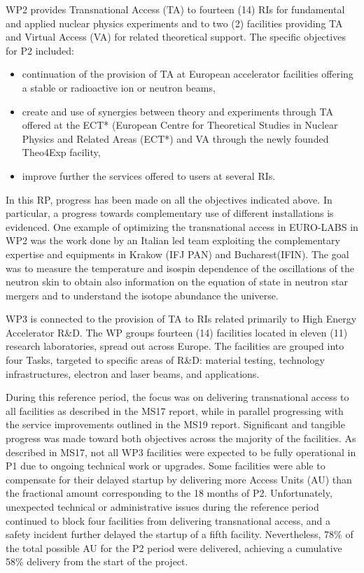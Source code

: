 WP2 provides Transnational Access (TA) to fourteen (14) RIs for fundamental and applied nuclear physics experiments and to two (2) facilities providing TA and Virtual Access (VA) for related theoretical support. 
The specific objectives for P2 included: 
\begin{itemize}
    \item continuation of the provision of TA at European accelerator facilities offering a stable or radioactive ion or neutron beams,
    \item create and use of synergies between theory and experiments through TA offered at the ECT* (European Centre for Theoretical Studies in Nuclear Physics and Related Areas (ECT*) and VA through the newly founded Theo4Exp facility,
    \item improve further the services offered to users at several RIs.
\end{itemize}

In this RP, progress has been made on all the objectives indicated above.
In particular, a progress towards complementary use of different installations is evidenced. 
One example of  optimizing the  transnational access in EURO-LABS in WP2 was the work done by an  Italian led team  exploiting the complementary expertise and equipments in Krakow (IFJ PAN) and Bucharest(IFIN). The goal was to  measure  the temperature and isospin dependence of the oscillations of the neutron skin  to obtain also information on the equation of state in neutron star mergers and to understand the isotope abundance the universe. 
 

WP3 is connected to the provision of TA to RIs related primarily to High Energy Accelerator R\&D. The WP groups fourteen (14) facilities located in eleven (11) research laboratories, spread out across Europe. The facilities are grouped into four Tasks, targeted to specific areas of R\&D: material testing, technology infrastructures, electron and laser beams, and applications. 

During this reference period, the focus was on delivering transnational access to all facilities as described in the MS17 report, while in parallel progressing with the service improvements outlined in the MS19 report. 
Significant and tangible progress was made toward both objectives across the majority of the facilities. As described in MS17, not all WP3 facilities were expected to be fully operational in P1 due to ongoing technical work or upgrades. Some facilities were able to compensate for their delayed startup by delivering more Access Units (AU) than the fractional amount corresponding to the 18 months of P2.
Unfortunately, unexpected technical or administrative issues during the reference period continued to block four facilities from delivering transnational access, and a safety incident further delayed the startup of a fifth facility. Nevertheless, 78\% of the total possible AU for the P2 period were delivered, achieving a cumulative 58\% delivery from the start of the project.

